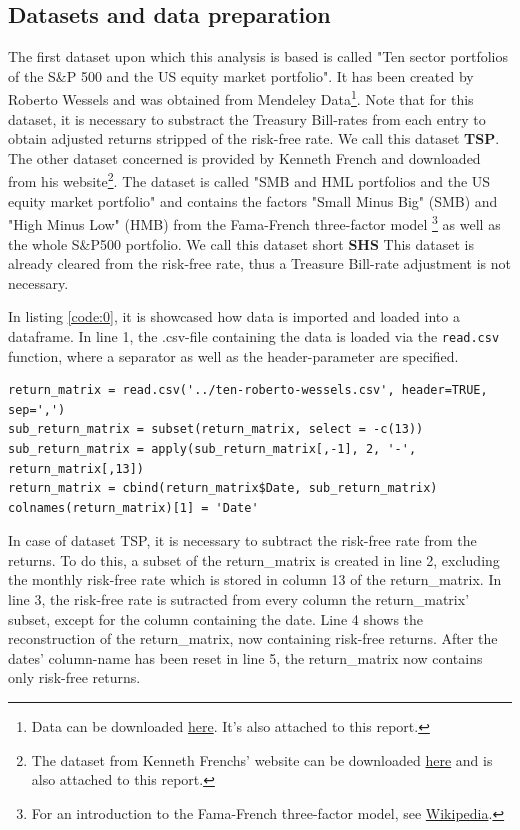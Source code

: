 \subsection{Datasets and data preparation}
The first dataset upon which this analysis is based is called "Ten sector portfolios of the S\&P 500 and the US equity market portfolio". It has been created by Roberto Wessels and was obtained from Mendeley Data\footnote{Data can be downloaded \href{https://data.mendeley.com/datasets/ndxfrshm74/3}{here}. It's also attached to this report.}. Note that for this dataset, it is necessary to substract the Treasury Bill-rates from each entry to obtain adjusted returns stripped of the risk-free rate. We call this dataset \textbf{TSP}.\\

The other dataset concerned is provided by Kenneth French and downloaded from his website\footnote{The dataset from Kenneth Frenchs' website can be downloaded \href{http://mba.tuck.dartmouth.edu/pages/faculty/ken.french/ftp/F-F_Research_Data_Factors_CSV.zip}{here} and is also attached to this report.}. The dataset is called "SMB and HML portfolios and the US equity market portfolio" and contains the factors "Small Minus Big" (SMB) and "High Minus Low" (HMB) from the Fama-French three-factor model \footnote{For an introduction to the Fama-French three-factor model, see \href{https://en.wikipedia.org/wiki/Fama\%E2\%80\%93French_three-factor_model}{Wikipedia}.} as well as the whole S\&P500 portfolio. We call this dataset short \textbf{SHS} This dataset is already cleared from the risk-free rate, thus a Treasure Bill-rate adjustment is not necessary.

In listing \ref{code:0}, it is showcased how data is imported and loaded into a dataframe. In line 1, the .csv-file containing the data is loaded via the \lstinline|read.csv| function, where a separator as well as the header-parameter are specified. 

\begin{lstlisting}[caption={Loading the data and subtracting the risk-free rate from the columns of returns yields a dataframe containing the matrix of excess-returns.}, label=code:0, frame=single]
return_matrix = read.csv('../ten-roberto-wessels.csv', header=TRUE, sep=',')
sub_return_matrix = subset(return_matrix, select = -c(13))
sub_return_matrix = apply(sub_return_matrix[,-1], 2, '-', return_matrix[,13])
return_matrix = cbind(return_matrix$Date, sub_return_matrix)
colnames(return_matrix)[1] = 'Date'
\end{lstlisting}
In case of dataset TSP, it is necessary to subtract the risk-free rate from the returns. To do this, a subset of the return\_matrix is created in line 2, excluding the monthly risk-free rate which is stored in column 13 of the return\_matrix. In line 3, the risk-free rate is sutracted from every column the return\_matrix' subset, except for the column containing the date. Line 4 shows the reconstruction of the return\_matrix, now containing risk-free returns. After the dates' column-name has been reset in line 5, the return\_matrix now contains only risk-free returns. 

